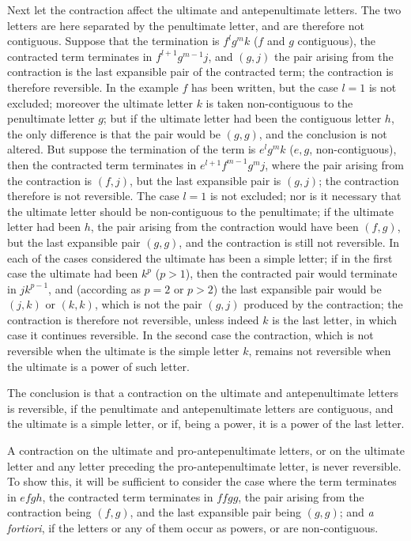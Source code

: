 \documentclass[11pt,a4paper]{book}
\begin{document}
Next let the contraction affect the ultimate and antepenultimate letters. The two letters are here separated by the penultimate letter, and are therefore not contiguous. Suppose that the termination is $f^lg^mk$ ($f$ and $g$ contiguous), the contracted term terminates in $f^{l+1}g^{m-1}j$, and $(g,j)$ the pair arising from the contraction is the last expansible pair of the contracted term; the contraction is therefore reversible. In the example $f$ has been written, but the case $l=1$ is not excluded; moreover the ultimate letter $k$ is taken non-contiguous to the penultimate letter $g$; but if the ultimate letter had been the contiguous letter $h$, the only difference is that the pair would be $(g,g)$, and the conclusion is not altered. But suppose the termination of the term is $e^lg^mk$ ($e,g$, non-contiguous), then the contracted term terminates in $e^{l+1}f^{m-1}g^mj$, where the pair arising from the contraction is $(f,j)$, but the last expansible pair is $(g,j)$; the contraction therefore is not reversible. The case $l=1$ is not excluded; nor is it necessary that the ultimate letter should be non-contiguous to the penultimate; if the ultimate letter had been $h$, the pair arising from the contraction would have been $(f,g)$, but the last expansible pair $(g,g)$, and the contraction is still not reversible. In each of the cases considered the ultimate has been a simple letter; if in the first case the ultimate had been $k^p$ ($p>1$), then the contracted pair would terminate in $jk^{p-1}$, and (according as $p=2$ or $p>2$) the last expansible pair would be $(j,k)$ or $(k,k)$, which is not the pair $(g,j)$ produced by the contraction; the contraction is therefore not reversible, unless indeed $k$ is the last letter, in which case it continues reversible. In the second case the contraction, which is not reversible when the ultimate is the simple letter $k$, remains not reversible when the ultimate is a power of such letter.

The conclusion is that a contraction on the ultimate and antepenultimate letters is reversible, if the penultimate and antepenultimate letters are contiguous, and the ultimate is a simple letter, or if, being a power, it is a power of the last letter.

A contraction on the ultimate and pro-antepenultimate letters, or on the ultimate letter and any letter preceding the pro-antepenultimate letter, is never reversible. To show this, it will be sufficient to consider the case where the term terminates in $efgh$, the contracted term terminates in $ffgg$, the pair arising from the contraction being $(f,g)$, and the last expansible pair being $(g,g)$; and \textit{a fortiori}, if the letters or any of them occur as powers, or are non-contiguous.
\end{document}
